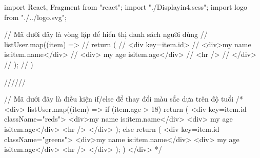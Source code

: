 import React, { Fragment } from "react";
import "./Displayin4.scss";
import logo from "./../logo.svg";

// Mã dưới đây là vòng lặp để hiển thị danh sách người dùng
// {listUser.map((item) => {
//   return (
//     <div key={item.id}>
//       <div>my name is:{item.name}</div>
//       <div> my age is{item.age}</div>
//       <hr />
//     </div>
//   );
// })}

//////

// Mã dưới đây là điều kiện if/else để thay đổi màu sắc dựa trên độ tuổi
/* <div>
{listUser.map((item) => {
  if (item.age > 18) {
    return (
      <div key={item.id} className="reds">
        <div>my name is:{item.name}</div>
        <div> my age is{item.age}</div>
        <hr />
      </div>
    );
  } else {
    return (
      <div key={item.id} className="greens">
        <div>my name is:{item.name}</div>
        <div> my age is{item.age}</div>
        <hr />
      </div>
    );
  }
})}
</div> */

